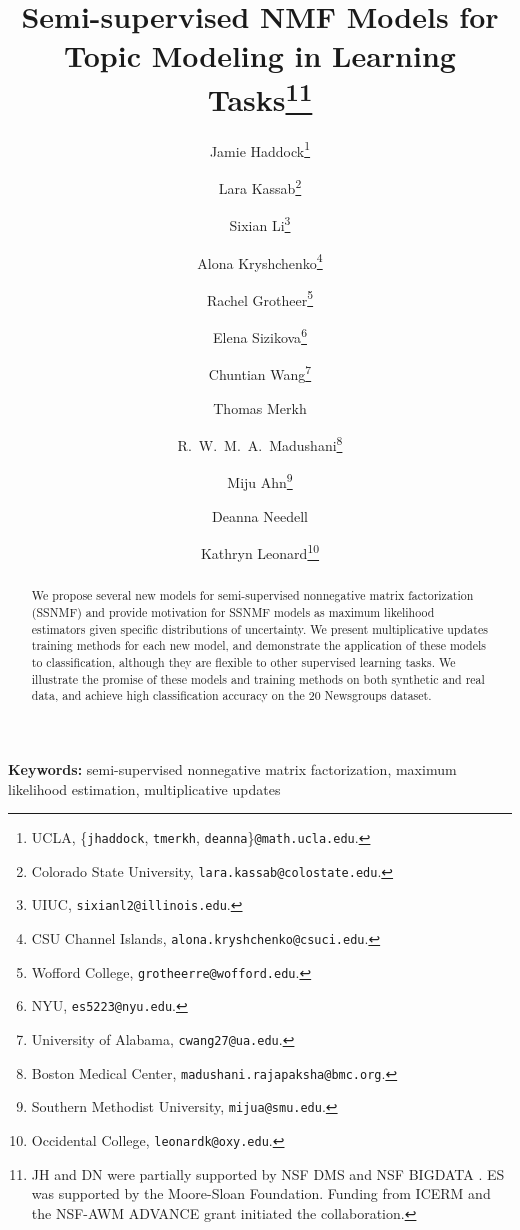 \documentclass[twocolumn,10pt]{article}
\newcommand*\samethanks[1][\value{footnote}]{\footnotemark[#1]}
\providecommand{\keywords}[1]{\noindent\textbf{\small Keywords:} #1}
\begin{document}
\title{\Large Semi-supervised NMF Models for Topic Modeling in Learning Tasks\thanks{JH and DN were partially supported by NSF DMS  and NSF BIGDATA . ES was supported by the Moore-Sloan Foundation. Funding from ICERM and the NSF-AWM ADVANCE grant initiated the collaboration.}}
\author{Jamie Haddock\thanks{UCLA, \{\texttt{jhaddock}, \texttt{tmerkh}, \texttt{deanna}\}\texttt{@math.ucla.edu}.}
\and Lara Kassab\thanks{Colorado State University, \texttt{lara.kassab@colostate.edu}.}
\and Sixian Li\thanks{UIUC, \texttt{sixianl2@illinois.edu}.}
\and Alona Kryshchenko\thanks{CSU Channel Islands, \texttt{alona.kryshchenko@csuci.edu}.}
\and Rachel Grotheer\thanks{Wofford College, \texttt{grotheerre@wofford.edu}.}
\and Elena Sizikova\thanks{NYU, \texttt{es5223@nyu.edu}.}
\and Chuntian Wang\thanks{University of Alabama,  \texttt{cwang27@ua.edu}.}
\and Thomas Merkh\samethanks[2]
\and R.\ W.\ M.\ A.\ Madushani\thanks{Boston Medical Center, \texttt{madushani.rajapaksha@bmc.org}.}
\and Miju Ahn\thanks{Southern Methodist University, \texttt{mijua@smu.edu}.}
\and Deanna Needell\samethanks[2] 
\and Kathryn Leonard\thanks{Occidental College, \texttt{leonardk@oxy.edu}.}
}

\date{}

\maketitle



\begin{abstract} {\small We propose several new models for semi-supervised nonnegative matrix factorization (SSNMF) and provide motivation for SSNMF models as maximum likelihood estimators given specific distributions of uncertainty.  We present multiplicative updates training methods for each new model, and demonstrate the application of these models to classification, although they are flexible to other supervised learning tasks.
We illustrate the promise of these models and training methods on both synthetic and real data, and achieve high classification accuracy on the 20 Newsgroups dataset.}\end{abstract}

\vspace{0.2cm}
\keywords{\small semi-supervised nonnegative matrix factorization, maximum likelihood estimation, multiplicative updates
}
\end{document}

